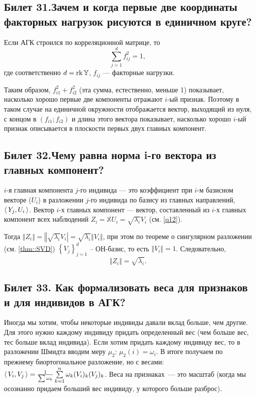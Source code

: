 \subsection{Билет 31.Зачем и когда первые две координаты факторных нагрузок рисуются в единичном круге?}
Если АГК строился по корреляционной матрице, то 
\begin{equation}
\sum\limits_{j = 1}^{d} f^2_{ij} = 1, 
\end{equation}
где соответственно $d = \operatorname{rk} \mathbb{Y}$, $f_{ij}$ --- факторные нагрузки.

Таким образом, $f^2_{i1} + f^2_{i2}$ (эта сумма, естественно, меньше 1) показывает, насколько хорошо первые две компоненты отражают $i$-ый признак.
Поэтому в таком случае на единичной окружности отображается вектор, выходящий из нуля, с концом в $(f_{i1};f_{i2})$ и длина этого вектора показывает, насколько хорошо $i$-ый признак описывается в плоскости первых двух главных компонент.

\subsection{Билет 32.Чему равна норма i-го вектора из главных компонент?}
$i$-я главная компонента $j$-го индивида --- это коэффициент при $i$-м базисном векторе ($U_i$) в разложении $j$-го индивида по базису из главных направлений, $\langle\,Y_j, U_i\,\rangle$. Вектор $i$-х главных компонент --- вектор, составленный из $i$-х главных компонент всех наблюдений $Z_i = \mathbb X U_i = \sqrt{\lambda_i} V_i$ (см. \ref{q12}).

Тогда $\left\Vert Z_i \right\Vert = \left\Vert \sqrt{\lambda_i} V_i\right\vert = \sqrt{\lambda_i} \left\Vert V_i\right\Vert$, при этом по теореме о сингулярном разложении (см. \ref{thm::SVD}) $\left\lbrace V_j\right\rbrace_{j=1}^d$ -- ОН-базис, то есть $\left\Vert V_i\right\Vert = 1$. Следовательно, $$\left\Vert Z_i \right\Vert = \sqrt{\lambda_i}.$$

\subsection{Билет 33. Как формализовать веса для признаков и для индивидов в АГК?}
Иногда мы хотим, чтобы некоторые индивиды давали вклад больше, чем другие. Для этого нужно каждому индивиду придать определенный вес (чем больше вес, тес больше вклад индивида). 
Если хотим придать каждому индивиду вес, то в разложении Шмидта вводим меру $\mu_2$: $\mu_2({i})=\omega_i$. В итоге получаем по прежнему биортогональное разложение, но с весами:
$\langle\,V_i, V_j\,\rangle =\frac{1}{\sum\omega_k}\sum\limits_{k=1}^{n} \omega_k (V_i)_k(V_j)_k$. 
Веса на признаках — это масштаб (когда мы осознанно придаем больший вес индивиду, у которого больше разброс).

